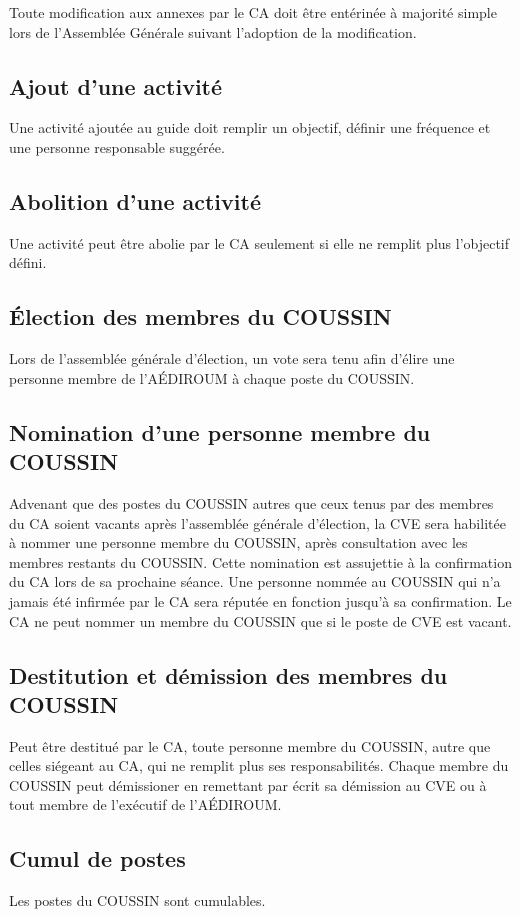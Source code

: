 \documentclass{aediroum}
\begin{document}
Toute modification aux annexes par le CA doit être entérinée à majorité simple lors de l'Assemblée Générale suivant l'adoption de la modification.

\subsection{Ajout d'une activité}
Une activité ajoutée au guide doit remplir un objectif, définir une fréquence et une personne responsable suggérée.

\subsection{Abolition d'une activité}
Une activité peut être abolie par le CA seulement si elle ne remplit plus l'objectif défini.

\subsection{Élection des membres du COUSSIN}
Lors de l'assemblée générale d'élection, un vote sera tenu afin d'élire une personne membre de l'AÉDIROUM à chaque poste du COUSSIN.

\subsection{Nomination d'une personne membre du COUSSIN}
Advenant que des postes du COUSSIN autres que ceux tenus par des membres du CA soient vacants après l'assemblée générale d'élection, la CVE sera habilitée à nommer une personne membre du COUSSIN, après consultation avec les membres restants du COUSSIN. Cette nomination est assujettie à la confirmation du CA lors de sa prochaine séance. Une personne nommée au COUSSIN qui n'a jamais été infirmée par le CA sera réputée en fonction jusqu'à sa confirmation. Le CA ne peut nommer un membre du COUSSIN que si le poste de CVE est vacant.

\subsection{Destitution et démission des membres du COUSSIN}
Peut être destitué par le CA, toute personne membre du COUSSIN, autre que celles siégeant au CA, qui ne remplit plus ses responsabilités. Chaque membre du COUSSIN peut démissioner en remettant par écrit sa démission au CVE ou à tout membre de l'exécutif de l'AÉDIROUM.

\subsection{Cumul de postes}
Les postes du COUSSIN sont cumulables.
\end{document}
